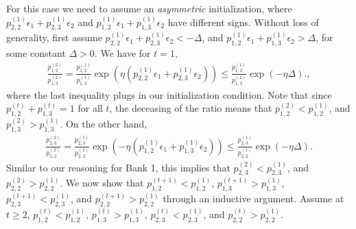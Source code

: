 For this case we need to assume an \emph{asymmetric} initialization, where $p^{(1)}_{2,2}\epsilon_1+p^{(1)}_{2,3}\epsilon_2$ and $p^{(1)}_{1,2}\epsilon_1+p^{(1)}_{1,3}\epsilon_2$ have different signs. Without loss of generality, first assume $p^{(1)}_{2,2}\epsilon_1+p^{(1)}_{2,3}\epsilon_2<-\Delta$, and $p^{(1)}_{1,2}\epsilon_1+p^{(1)}_{1,3}\epsilon_2>\Delta$, for some constant $\Delta>0$. 
We have for $t=1$,  
\begin{equation*}
    \begin{split}
\frac{p^{(2)}_{1,2}}{p^{(2)}_{1,3}} = \frac{p^{(1)}_{1,2}}{p^{(1)}_{1,3}}\exp\left(\eta\left(p^{(1)}_{2,2}\epsilon_1 + p^{(1)}_{2,3}\epsilon_2\right)\right) \leq   \frac{p^{(1)}_{1,2}}{p^{(1)}_{1,3}}\exp(-\eta\Delta).,
    \end{split}
\end{equation*}
where the last inequality plugs in our initialization condition.
Note that since $p^{(t)}_{1,2}+p^{(t)}_{1,3}=1$ for all $t$, the deceasing of the ratio means that $p^{(2)}_{1,2}< p^{(1)}_{1,2}$, and $p^{(2)}_{1,3}> p^{(1)}_{1,3}$. On the other hand, 
\begin{equation*}
    \begin{split}
\frac{p^{(2)}_{2,3}}{p^{(2)}_{2,2}} = \frac{p^{(1)}_{2,3}}{p^{(1)}_{2,2}}\exp\left(-\eta\left(p^{(1)}_{1,2}\epsilon_1 + p^{(1)}_{1,3}\epsilon_2\right)\right) \leq   \frac{p^{(1)}_{2,3}}{p^{(1)}_{2,2}}\exp(-\eta \Delta). 
    \end{split}
\end{equation*}
Similar to our reasoning for Bank 1, this implies that $p^{(2)}_{2,3}<p^{(1)}_{2,3}$, and $p^{(2)}_{2,2}>p^{(1)}_{2,2}$. 
We now show that $p^{(t+1)}_{1,2}< p^{(1)}_{1,2}$,  $p^{(t+1)}_{1,3}> p^{(1)}_{1,3}$, $p^{(t+1)}_{2,3}<p^{(1)}_{2,3}$, and $p^{(t+1)}_{2,2}>p^{(1)}_{2,2}$ through an inductive argument.
Assume at $t\geq 2$, $p^{(t)}_{1,2}< p^{(1)}_{1,2}$,  $p^{(t)}_{1,3}> p^{(1)}_{1,3}$, $p^{(t)}_{2,3}<p^{(1)}_{2,3}$, and $p^{(t)}_{2,2}>p^{(1)}_{2,2}$.
